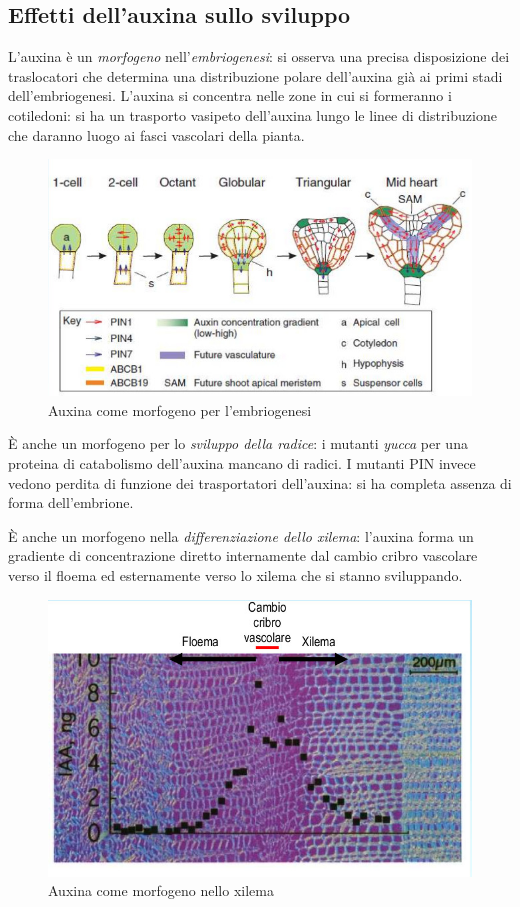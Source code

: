 \documentclass[a4paper,12pt]{book}
\begin{document}
\subsection{Effetti dell'auxina sullo sviluppo}
L'auxina è un \emph{morfogeno} nell'\emph{embriogenesi}: si osserva una precisa disposizione dei traslocatori che determina una distribuzione polare dell'auxina già ai primi stadi dell'embriogenesi. L'auxina si concentra nelle zone in cui si formeranno i cotiledoni: si ha un trasporto vasipeto dell'auxina lungo le linee di distribuzione che daranno luogo ai fasci vascolari della pianta.
\begin{figure}[H]
\centering
\includegraphics[scale=0.4]{immagini/morfo.jpg}
\caption{Auxina come morfogeno per l'embriogenesi}
\end{figure}
È anche un morfogeno per lo \emph{sviluppo della radice}: i mutanti \emph{yucca} per una proteina di catabolismo dell'auxina mancano di radici. I mutanti PIN invece vedono perdita di funzione dei trasportatori dell'auxina: si ha completa assenza di forma dell'embrione.

È anche un morfogeno nella \emph{differenziazione dello xilema}: l’auxina
forma un gradiente di
concentrazione
diretto
internamente dal cambio cribro
vascolare verso il floema ed
esternamente verso lo xilema
che si stanno sviluppando.
\begin{figure}[H]
\centering
\includegraphics[scale=0.4]{immagini/morf.jpg}
\caption{Auxina come morfogeno nello xilema}
\end{figure}
\end{document}
